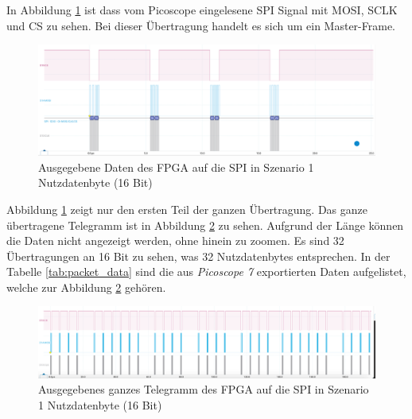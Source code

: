 In Abbildung \ref{fig:ResultatFPGANoBuff} ist dass vom Picoscope eingelesene SPI Signal mit MOSI, SCLK und CS zu sehen. Bei dieser Übertragung handelt es sich um ein Master-Frame.


\begin{figure}[H]
    \centering
    \includegraphics[width=1\linewidth]{Figures/Chap4/FPGA/Test_FPGA_noBuff_signal.png}
    \caption{Ausgegebene Daten des FPGA auf die SPI in Szenario 1 Nutzdatenbyte (16 Bit)}
    \label{fig:ResultatFPGANoBuff}
\end{figure}

Abbildung \ref{fig:ResultatFPGANoBuff} zeigt nur den ersten Teil der ganzen Übertragung. Das ganze übertragene Telegramm ist in Abbildung \ref{fig:ResultatFPGANoBuffFull} zu sehen. Aufgrund der Länge können die Daten nicht angezeigt werden, ohne hinein zu zoomen.
Es sind 32 Übertragungen an 16 Bit zu sehen, was 32 Nutzdatenbytes entsprechen. In der Tabelle \ref{tab:packet_data} sind die aus \textit{Picoscope 7} exportierten Daten aufgelistet, welche zur Abbildung \ref{fig:ResultatFPGANoBuffFull} gehören.

\begin{figure}[H]
    \centering
    \includegraphics[width=1\linewidth]{Figures/Chap4/FPGA/Test_FPGA_noBuff_signal_full.png}
    \caption{Ausgegebenes ganzes Telegramm des FPGA auf die SPI in Szenario 1 Nutzdatenbyte (16 Bit)}
    \label{fig:ResultatFPGANoBuffFull}
\end{figure}

